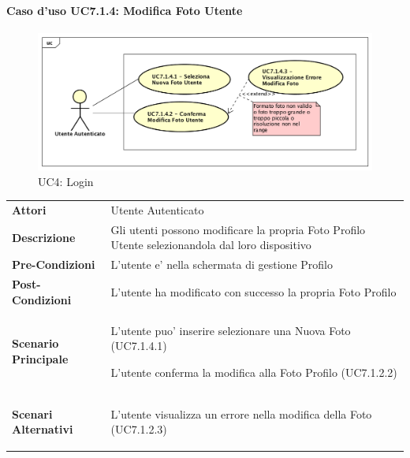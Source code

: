 \paragraph{Caso d'uso UC7.1.4:  Modifica Foto Utente}
\label{UC7_1_4}
\begin{figure}[ht]
	\centering
	\includegraphics[scale=0.45]{UML/UC7_1_4.png}
	\caption{UC4: Login}
\end{figure}
\FloatBarrier
\begin{tabular}{ l | p{11cm}}
	\hline
	\rowcolor{Gray}
	 \multicolumn{2}{c}{UC7.1.4 - Modifica Foto Utente} \\
	 \hline
		\textbf{Attori} & Utente Autenticato \\
	\textbf{Descrizione} & Gli utenti possono modificare la propria Foto Profilo Utente selezionandola dal loro dispositivo\\
	\textbf{Pre-Condizioni} & L'utente e' nella schermata di gestione Profilo\\
	\textbf{Post-Condizioni} & L'utente ha modificato con successo la propria Foto Profilo \\
	\textbf{Scenario Principale} & 
	\begin{enumerate*}[label=(\arabic*.),itemjoin={\newline}]
		\item L'utente puo' inserire selezionare una Nuova Foto (UC7.1.4.1)
		\item L'utente conferma la modifica alla Foto Profilo (UC7.1.2.2)
	\end{enumerate*}\\
	\textbf{Scenari Alternativi} & 
	\begin{enumerate*}[label=(\arabic*.),itemjoin={\newline}]
		\item L'utente visualizza un errore nella modifica della Foto (UC7.1.2.3)
	\end{enumerate*}\\
\end{tabular}
